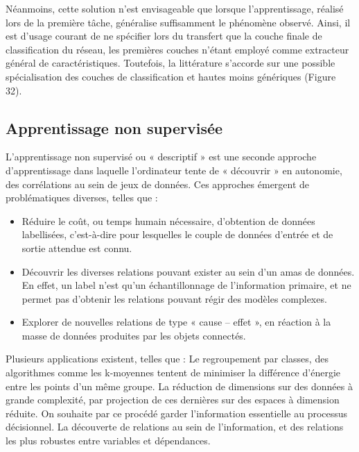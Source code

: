 Néanmoins, cette solution n’est envisageable que lorsque l’apprentissage, réalisé lors de la première tâche, généralise suffisamment le phénomène observé. Ainsi, il est d’usage courant de ne spécifier lors du transfert que la couche finale de classification du réseau, les premières couches n’étant employé comme extracteur général de caractéristiques. Toutefois, la littérature s’accorde sur une possible spécialisation des couches de classification et hautes moins génériques (Figure 32).
   

\subsection{Apprentissage non supervisée}
L’apprentissage non supervisé ou « descriptif » est une seconde approche d’apprentissage dans laquelle l’ordinateur tente de « découvrir » en autonomie, des corrélations au sein de jeux de données. Ces approches émergent de problématiques diverses, telles que :
\begin{itemize}
    \item Réduire le coût, ou temps humain nécessaire, d’obtention de données labellisées, c’est-à-dire pour lesquelles le couple de données d’entrée et de sortie attendue est connu.
    \item Découvrir les diverses relations pouvant exister au sein d’un amas de données. En effet, un label n’est qu’un échantillonnage de l’information primaire, et ne permet pas d’obtenir les relations pouvant régir des modèles complexes.
    \item Explorer de nouvelles relations de type « cause – effet », en réaction à la masse de données produites par les objets connectés. 
\end{itemize}\par

	


Plusieurs applications existent, telles que :
	Le regroupement par classes, des algorithmes comme les k-moyennes tentent de minimiser la différence d’énergie entre les points d’un même groupe.
	La réduction de dimensions sur des données à grande complexité, par projection de ces dernières sur des espaces à dimension réduite. On souhaite par ce procédé garder l’information essentielle au processus décisionnel.
	La découverte de relations au sein de l’information, et des relations les plus robustes entre variables et dépendances.
 
